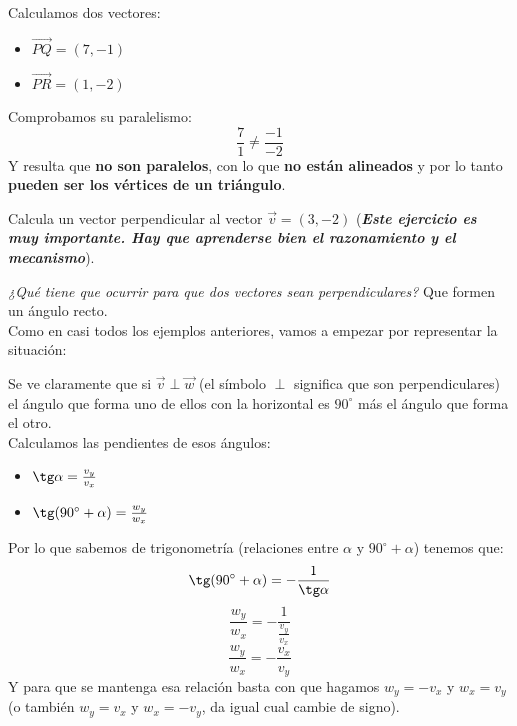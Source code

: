 \documentclass[a4paper,11pt,answers]{exam}
\newcommand\ddfrac[2]{\frac{\displaystyle #1}{\displaystyle #2}}
\newcommand{\degree}{^\circ}
\begin{document}
\begin{questions}
\begin{solution}
    Calculamos dos vectores:
    \begin{itemize}
    \item $\overrightarrow{PQ} = (7, -1)$
    \item $\overrightarrow{PR} = (1, -2)$
    \end{itemize}
    Comprobamos su paralelismo:
    \[\frac{7}{1} \neq \frac{-1}{-2}\]
    Y resulta que \textbf{no son paralelos}, con lo que \textbf{no están alineados} y por lo tanto
    \textbf{pueden ser los vértices de un triángulo}.
  \end{solution}
\question Calcula un vector perpendicular al vector $\vec{v} = (3, -2)$ (\textbf{\emph{Este
      ejercicio es muy importante. Hay que aprenderse bien el razonamiento y el mecanismo}}).
  \begin{solution}
    \emph{¿Qué tiene que ocurrir para que dos vectores sean perpendiculares?} Que formen un ángulo
    recto.\\
    Como en casi todos los ejemplos anteriores, vamos a empezar por representar la situación:
    \begin{center}
    \end{center}
    Se ve claramente que si $\vec{v} \perp \vec{w}$ (el símbolo $\boldsymbol{\perp}$ significa
    que son perpendiculares) el ángulo que forma uno de ellos con la horizontal es $90\degree$
    más el ángulo que forma el otro.\\
    Calculamos las pendientes de esos ángulos:
    \begin{itemize}
    \item $\tg \alpha = \frac{v_y}{v_x}$
    \item $\tg (90\degree + \alpha) = \frac{w_y}{w_x}$
    \end{itemize}
    Por lo que sabemos de trigonometría (relaciones entre $\alpha$ y $90\degree + \alpha$)
    tenemos que:
    \[\tg (90\degree + \alpha) = -\frac{1}{\tg \alpha}\]
    \[\frac{w_y}{w_x} = -\ddfrac{1}{\ddfrac{v_y}{v_x}}\]
    \[\frac{w_y}{w_x} = -\frac{v_x}{v_y}\]
    Y para que se mantenga esa relación basta con que hagamos $w_y = -v_x$ y $w_x = v_y$ (o también
    $w_y = v_x$ y $w_x = -v_y$, da igual cual cambie de signo).\\


\end{solution}
\end{questions}
\end{document}
